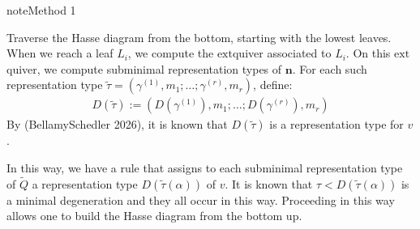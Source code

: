 \documentclass[letterpaper,10pt,english]{sphinxmanual}
\begin{document}
\begin{sphinxadmonition}{note}{Method 1}

\sphinxAtStartPar
Traverse the Hasse diagram from the bottom, starting with the lowest leaves. When we reach a leaf \(L_i\), we compute the \(\mathrm{ext}\)\sphinxhyphen{}quiver associated to \(L_i\). On this \(\mathrm{ext}\)\sphinxhyphen{}quiver, we compute subminimal representation types of \(\mathbf{n}\). For each such representation type \(\tilde{\tau}=(\gamma^{(1)},m_1;\dots;\gamma^{(r)},m_r)\), define:
\begin{equation*}
\begin{split}D(\tilde{\tau}):=\left(D(\gamma^{(1)}),m_1;\dots;D(\gamma^{(r)}),m_r\right)\end{split}
\end{equation*}
\sphinxAtStartPar
By (Bellamy\sphinxhyphen{}Schedler 2026), it is known that \(D(\tilde{\tau})\) is a representation type for \(v\).

\sphinxAtStartPar
In this way, we have a rule that assigns to each subminimal representation type of \(\tilde{Q}\) a representation type \(D(\tilde{\tau}(\alpha))\) of \(v\). It is known that \(\tau < D(\tilde{\tau}(\alpha))\) is a minimal degeneration and they all occur in this way. Proceeding in this way allows one to build the Hasse diagram from the bottom up.
\end{sphinxadmonition}
\end{document}
